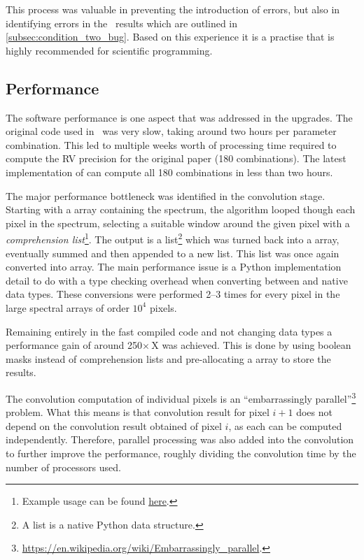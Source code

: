 This process was valuable in preventing the introduction of errors, but also in identifying errors in the~\citet{figueira_radial_2016} results which are outlined in \cref{subsec:condition_two_bug}.
Based on this experience it is a practise that is highly recommended for scientific programming.

\subsection{Performance}
\label{subsec:code_performance}
The software performance is one aspect that was addressed in the upgrades.
The original code used in~\citet{figueira_radial_2016} was very slow, taking around two hours per parameter combination.
This led to multiple weeks worth of processing time required to compute the {RV} precision for the original paper (180 combinations).
The latest implementation of \eniric{} can compute all 180 combinations in less than two hours.

The major performance bottleneck was identified in the convolution stage.
Starting with a \numpy{} array containing the spectrum, the algorithm looped though each pixel in the spectrum, selecting a suitable window around the given pixel with a \emph{comprehension list}\footnote{Example usage can be found \href{https://docs.python.org/3/tutorial/datastructures.html\#list-comprehensions}{here}.}.
The output is a list\footnote{A list is a native Python data structure.} which was turned back into a \numpy{} array, eventually summed and then appended to a new list.
This list was once again converted into \numpy{} array.
The main performance issue is a Python implementation detail to do with a type checking overhead when converting between \numpy{} and native data types.
These conversions were performed 2--3 times for every pixel in the large spectral arrays of order \({10}^{4}\) pixels.

Remaining entirely in the fast compiled \numpy{} code and not changing data types a performance gain of around 250\(\times\)\,X was achieved.
This is done by using boolean masks instead of comprehension lists and pre-allocating a \numpy{} array to store the results.

The convolution computation of individual pixels is an ``embarrassingly parallel''\footnote{\href{https://en.wikipedia.org/wiki/Embarrassingly\_parallel}{https://en.wikipedia.org/wiki/Embarrassingly\_parallel}.} problem.
What this means is that convolution result for pixel $i+1$ does not depend on the convolution result obtained of pixel $i$, as each can be computed independently.
Therefore, parallel processing was also added into the convolution to further improve the performance, roughly dividing the convolution time by the number of processors used.

